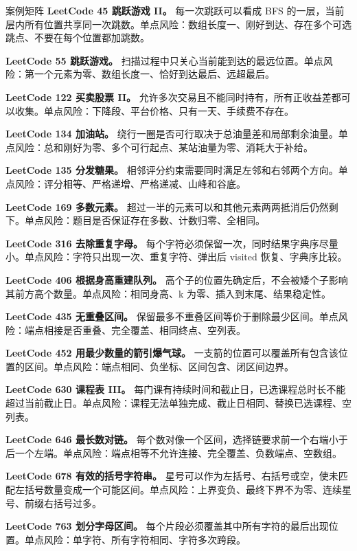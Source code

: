 \begin{principlebox}{案例矩阵}
\textbf{LeetCode 45 跳跃游戏 II。}
每一次跳跃可以看成 BFS 的一层，当前层内所有位置共享同一次跳数。单点风险：数组长度一、刚好到达、存在多个可选跳点、不要在每个位置都加跳数。

\textbf{LeetCode 55 跳跃游戏。}
扫描过程中只关心当前能到达的最远位置。单点风险：第一个元素为零、数组长度一、恰好到达最后、远超最后。

\textbf{LeetCode 122 买卖股票 II。}
允许多次交易且不能同时持有，所有正收益差都可以收集。单点风险：下降段、平台价格、只有一天、手续费不存在。

\textbf{LeetCode 134 加油站。}
绕行一圈是否可行取决于总油量差和局部剩余油量。单点风险：总和刚好为零、多个可行起点、某站油量为零、消耗大于补给。

\textbf{LeetCode 135 分发糖果。}
相邻评分约束需要同时满足左邻和右邻两个方向。单点风险：评分相等、严格递增、严格递减、山峰和谷底。

\textbf{LeetCode 169 多数元素。}
超过一半的元素可以和其他元素两两抵消后仍然剩下。单点风险：题目是否保证存在多数、计数归零、全相同。

\textbf{LeetCode 316 去除重复字母。}
每个字符必须保留一次，同时结果字典序尽量小。单点风险：字符只出现一次、重复字符、弹出后 visited 恢复、字典序比较。

\textbf{LeetCode 406 根据身高重建队列。}
高个子的位置先确定后，不会被矮个子影响其前方高个数量。单点风险：相同身高、k 为零、插入到末尾、结果稳定性。

\textbf{LeetCode 435 无重叠区间。}
保留最多不重叠区间等价于删除最少区间。单点风险：端点相接是否重叠、完全覆盖、相同终点、空列表。

\textbf{LeetCode 452 用最少数量的箭引爆气球。}
一支箭的位置可以覆盖所有包含该位置的区间。单点风险：端点相同、负坐标、区间包含、闭区间边界。

\textbf{LeetCode 630 课程表 III。}
每门课有持续时间和截止日，已选课程总时长不能超过当前截止日。单点风险：课程无法单独完成、截止日相同、替换已选课程、空列表。

\textbf{LeetCode 646 最长数对链。}
每个数对像一个区间，选择链要求前一个右端小于后一个左端。单点风险：端点相等不允许连接、完全覆盖、负数端点、空数组。

\textbf{LeetCode 678 有效的括号字符串。}
星号可以作为左括号、右括号或空，使未匹配左括号数量变成一个可能区间。单点风险：上界变负、最终下界不为零、连续星号、前缀右括号过多。

\textbf{LeetCode 763 划分字母区间。}
每个片段必须覆盖其中所有字符的最后出现位置。单点风险：单字符、所有字符相同、字符多次跨段。

\end{principlebox}

